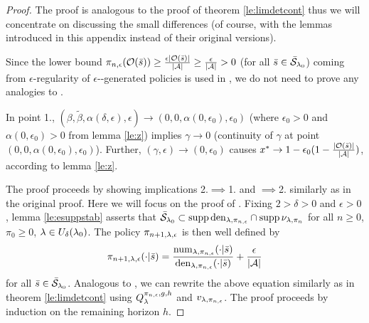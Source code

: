 \begin{proof}
The proof is analogous to the proof of theorem \ref{le:limdetcont} thus we will concentrate on
discussing the small differences (of course, with the lemmas introduced in this appendix instead of their original versions).

Since the lower bound $\pi_{n,\epsilon}(\mathcal{O}(\bar{s})) \geq \frac{\epsilon|\mathcal{O}(\bar{s})|}{|\mathcal{A}|}\geq \frac{\epsilon}{|\mathcal{A}|} > 0$ (for all $\bar{s}\in \bar{\mathcal{S}}_{\mathit{\lambda}_0}$) coming from $\epsilon$-regularity of $\epsilon$-\eUDRL{}-generated policies is used in , we do not need to prove any analogies to .

In point 1., $(\beta,\tilde{\beta},\alpha(\delta,\epsilon),\epsilon) \rightarrow (0,0,\alpha(0,\epsilon_0),\epsilon_0)$
(where $\epsilon_0 >0$ and $\alpha(0,\epsilon_0) >0$ from lemma \ref{le:z})
implies $\gamma \rightarrow 0$ (continuity of $\gamma$ at point $(0,0,\alpha(0,\epsilon_0),\epsilon_0)$). Further,
$(\gamma,\epsilon) \rightarrow (0,\epsilon_0)$ causes
$x^* \rightarrow 1-\epsilon_0(1-\frac{|\mathcal{O}(\bar{s})|}{|\mathcal{A}|})$, according to lemma \ref{le:z}.

The proof proceeds by showing implications 2.$\implies$1. and $\implies$2. similarly as in the original proof.
Here we will focus on the proof of .
Fixing $2>\delta>0$ and $\epsilon >0$,
 lemma \ref{le:esuppstab} asserts that $\bar{\mathcal{S}}_{\mathit{\lambda}_0} \subset \operatorname*{\mathrm{supp}} \mathrm{den}_{\mathit{\lambda},\pi_{n,\epsilon}} \cap \operatorname*{\mathrm{supp}} \nu_{\mathit{\lambda},\pi_n}$
for all $n\geq 0$,$\pi_0 \geq 0$, $\mathit{\lambda} \in U_{\delta}(\mathit{\lambda}_0)$.
The policy $\pi_{n+1,\mathit{\lambda},\epsilon}$ is then well defined by
$$
\pi_{n+1,\mathit{\lambda},\epsilon}(\cdot|\bar{s}) =
\frac{\mathrm{num}_{\mathit{\lambda},\pi_{n,\epsilon}}(\cdot|\bar{s})}
{\mathrm{den}_{\mathit{\lambda},\pi_{n,\epsilon}}(\cdot|\bar{s})}
+ \frac{\epsilon}{|\mathcal{A}|}
\label{eq:epirec}
$$
for all $\bar{s} \in \bar{\mathcal{S}}_{\mathit{\lambda}_0}$.
Analogous to , we can rewrite the above equation similarly
as in theorem \ref{le:limdetcont} using $Q_{\mathit{\lambda}}^{\pi_{n,\epsilon},g,h}$
and $v_{\mathit{\lambda},\pi_{n,\epsilon}}$.
The proof proceeds by induction on the remaining horizon $h$.


\end{proof}

